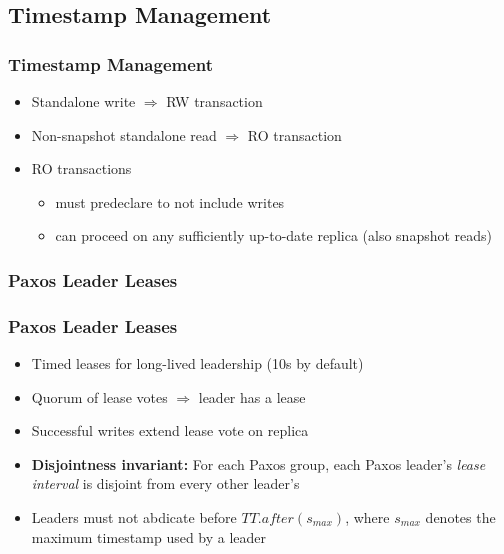 \documentclass{beamer}
\begin{document}
\subsection{Timestamp Management}
\begin{frame}
  \frametitle{Timestamp Management}
  \begin{itemize}
    \item{Standalone write $\Rightarrow$ RW transaction}
    \item{Non-snapshot standalone read $\Rightarrow$ RO transaction}
    \item{RO transactions}
    \begin{itemize}
      \item{must predeclare to not include writes}
      \item{can proceed on any sufficiently up-to-date replica (also snapshot
        reads)
      }
    \end{itemize}
  \end{itemize}
\end{frame}

\subsubsection{Paxos Leader Leases}
\begin{frame}
  \frametitle{Paxos Leader Leases}
  \begin{itemize}
    \item{Timed leases for long-lived leadership (10s by default)}
    \item{Quorum of lease votes $\Rightarrow$ leader has a lease}
    \item{Successful writes extend lease vote on replica}
    \item{\textbf{Disjointness invariant:} \newline
      For each Paxos group, each Paxos leader's \emph{lease interval} is disjoint
      from every other leader's
    }
    \item{Leaders must not abdicate before $TT.after(s_{max})$, where $s_{max}$
      denotes the maximum timestamp used by a leader
    }
  \end{itemize}
\end{frame}
\end{document}
